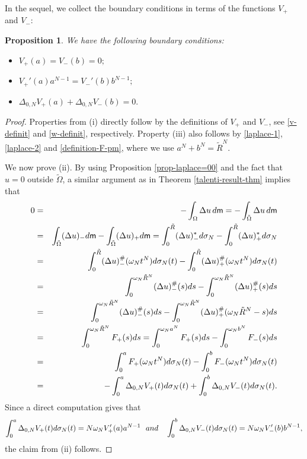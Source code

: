\documentclass[11pt, reqno]{amsart}
\newtheorem{proposition}{Proposition}[section]
\numberwithin{equation}{section}
\begin{document}
		In the sequel, we collect the boundary conditions in terms of the functions $V_+$ and $V_-$: 
				

		\begin{proposition} We have the following boundary conditions: 
			\begin{itemize}
				\item[(i)] $V_+(a)=V_-(b)=0;$ 
				\item[(ii)] $V_+'(a)a^{N-1}=V_-'(b)b^{N-1};$
				\item[(iii)] $\Delta_{0,N}V_+(a)+\Delta_{0,N}V_-(b)=0.$
			\end{itemize}
		\end{proposition}
		
		\begin{proof}
			Properties from (i) directly follow by the definitions of $V_+$ and $V_-$, see \eqref{v-definit} and \eqref{w-definit}, respectively. Property (iii) also follows by \eqref{laplace-1},  \eqref{laplace-2} and  \eqref{definition-F-pm}, where we use  $a^N+b^N=\tilde R^N$.
			
			We now prove (ii). 	By using Proposition \ref{prop-laplace=00} and the fact that    $u=0$ outside  $\tilde{\Omega}$,  a similar argument as in Theorem \ref{talenti-result-thm} implies that
			\begin{eqnarray*}
				0&=&-\int_{ \Omega}\Delta u\,{\rm d}{\sf m}=-\int_{\tilde \Omega}\Delta u\,{\rm d}{\sf m}\\&=&\int_{\tilde \Omega}(\Delta u)_-{\rm d}{\sf m}-\int_{\tilde \Omega}(\Delta u)_+{\rm d}{\sf m}=\int_{0}^{\tilde R}(\Delta  u)_-^*{\rm d}\sigma_N -\int_{0}^{\tilde R}(\Delta  u)_+^*{\rm d}\sigma_N\\&=&\int_{0}^{\tilde R}(\Delta  u)_-^\#(\omega_N t^N){\rm d}\sigma_N(t)-\int_{0}^{\tilde R}(\Delta  u)_+^\#(\omega_N t^N){\rm d}\sigma_N(t)\\&=&
				\int_0^{\omega_N \tilde R^N}(\Delta u)_-^\#(s){\rm d}s-\int_0^{\omega_N \tilde R^N}(\Delta u)_+^\#(s){\rm d}s\\&=&\int_0^{\omega_N \tilde R^N}(\Delta u)_-^\#(s){\rm d}s-\int_0^{\omega_N \tilde R^N}(\Delta u)_+^\#(\omega_N \tilde R^N-s){\rm d}s\\&=&\int_0^{\omega_N \tilde R^N}F_+(s){\rm d}s = \int_0^{\omega_N a^N}F_+(s){\rm d}s - \int_0^{\omega_N b^N}F_-(s){\rm d}s\\&=& \int_0^{a}F_+(\omega_N t^N){\rm d}\sigma_N(t) - \int_0^{b}F_-(\omega_N t^N){\rm d}\sigma_N(t)\\&=& -\int_0^{a}\Delta_{0,N} V_+(t){\rm d}\sigma_N(t) + \int_0^{b}\Delta_{0,N} V_-(t){\rm d}\sigma_N(t).
			\end{eqnarray*}
			Since a direct computation gives that $$\int_0^{a}\Delta_{0,N} V_+(t){\rm d}\sigma_N(t)=N\omega_N V_+'(a)a^{N-1}\ \ {\rm and}\ \ \ \int_0^{b}\Delta_{0,N} V_-(t){\rm d}\sigma_N(t)=N\omega_N V_-'(b)b^{N-1},$$
			the claim from (ii) follows. 
		\end{proof}
		
\end{document}
